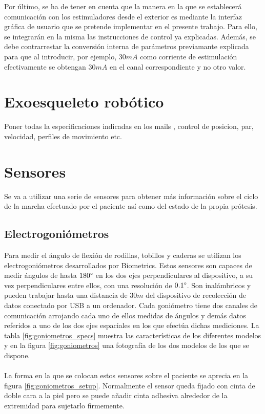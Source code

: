 Por último, se ha de tener en cuenta que la manera en la que se establecerá comunicación con los estimuladores desde el exterior es mediante la interfaz gráfica de usuario que se pretende implementar en el presente trabajo. Para ello, se integrarán en la misma las instrucciones de control ya explicadas. Además, se debe contrarrestar la conversión interna de parámetros previamante explicada para que al introducir, por ejemplo, $30mA$ como corriente de estimulación efectivamente se obtengan $30mA$ en el canal correspondiente y no otro valor.

\section{Exoesqueleto robótico}
Poner todas la especificaciones indicadas en los mails , control de posicion, par, velocidad, perfiles de movimiento etc.


\section{Sensores}
Se va a utilizar una serie de sensores para obtener más información sobre el ciclo de la marcha efectuado por el paciente así como del estado de la propia prótesis.

\subsection{Electrogoniómetros}
Para medir el ángulo de flexión de rodillas, tobillos y caderas se utilizan los electrogoniómetros desarrollados por Biometrics\cite{goniometros}. Estos sensores son capaces de medir ángulos de hasta $180\degree$ en los dos ejes perpendiculares al dispositivo, a su vez perpendiculares entre ellos, con una resolución de $0.1\degree$. Son inalámbricos y pueden trabajar hasta una distancia de $30m$ del dispositivo de recolección de datos conectado por USB a un ordenador. Cada goniómetro tiene dos canales de comunicación arrojando cada uno de ellos medidas de ángulos y demás datos referidos a uno de los dos ejes espaciales en los que efectúa dichas mediciones. La tabla \ref{fig:goniometros_specs} muestra las características de los diferentes modelos y en la figura \ref{fig:goniometros} una fotografía de los dos modelos de los que se dispone. 
\\
\\
La forma en la que se colocan estos sensores sobre el paciente se aprecia en la figura \ref{fig:goniometros_setup}. Normalmente el sensor queda fijado con cinta de doble cara a la piel pero se puede añadir cinta adhesiva alrededor de la extremidad para sujetarlo firmemente.\\

